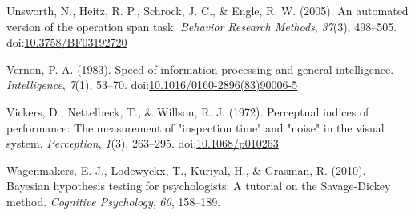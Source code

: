 \documentclass[
  ,man]{apa6}
\newlength{\cslhangindent}
\newenvironment{CSLReferences}[2] %
 {\begin{list}{}{%
  \setlength{\itemindent}{0pt}
  \setlength{\leftmargin}{0pt}
  \setlength{\parsep}{0pt}
  \ifodd #1
   \setlength{\leftmargin}{\cslhangindent}
   \setlength{\itemindent}{-1\cslhangindent}
  \fi
  \setlength{\itemsep}{#2\baselineskip}}}
 {\end{list}}
\begin{document}
\begin{CSLReferences}{1}{0}
Unsworth, N., Heitz, R. P., Schrock, J. C., \& Engle, R. W. (2005). An automated version of the operation span task. \emph{Behavior Research Methods}, \emph{37}(3), 498--505. doi:\href{https://doi.org/10.3758/BF03192720}{10.3758/BF03192720}

Vernon, P. A. (1983). Speed of information processing and general intelligence. \emph{Intelligence}, \emph{7}(1), 53--70. doi:\href{https://doi.org/10.1016/0160-2896(83)90006-5}{10.1016/0160-2896(83)90006-5}

Vickers, D., Nettelbeck, T., \& Willson, R. J. (1972). Perceptual indices of performance: {The} measurement of "inspection time" and "noise" in the visual system. \emph{Perception}, \emph{1}(3), 263--295. doi:\href{https://doi.org/10.1068/p010263}{10.1068/p010263}

Wagenmakers, E.-J., Lodewyckx, T., Kuriyal, H., \& Grasman, R. (2010). Bayesian hypothesis testing for psychologists: {A} tutorial on the {Savage-Dickey} method. \emph{Cognitive Psychology}, \emph{60}, 158--189.

\end{CSLReferences}
\end{document}
